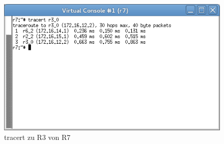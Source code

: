\documentclass[a4paper,10pt]{article}
\begin{document}
\begin{figure}[h]
  \centering\includegraphics[scale=.5]{tracert_r7_to_r3.png}
  \caption{tracert zu R3 von R7}
\end{figure}

\newpage
\end{document}
